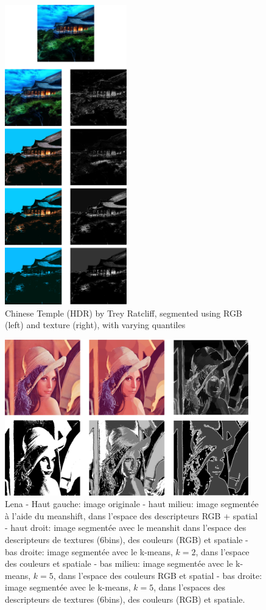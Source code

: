 \documentclass{article}
\begin{document}
\begin{figure}[h]
\begin{center}
\includegraphics[width=200px]{images/all_chinese_temple.png}
\end{center}
\caption{Chinese Temple (HDR) by Trey Ratcliff, segmented using RGB (left) and
texture (right), with varying quantiles}
\end{figure}

\begin{figure}[h]
\label{lena}
\includegraphics[width=400px]{images/all_lena.png}
\caption{Lena - Haut gauche: image originale - haut milieu: image segmentée à
l'aide du meanshift, dans l'espace des descripteurs RGB + spatial - haut
droit: image segmentée avec le meanshit dans l'espace des descripteurs de
textures (6bins), des couleurs (RGB) et spatiale - bas droite: image segmentée
avec le k-means, $k = 2$, dans l'espace des couleurs et spatiale - bas milieu:
image segmentée avec le k-means, $k = 5$, dans l'espace des couleurs RGB et
spatial - bas droite: image segmentée avec le k-means, $k = 5$, dans l'espaces
des descripteurs de textures (6bins), des couleurs (RGB) et spatiale.}
\end{figure}
\end{document}
